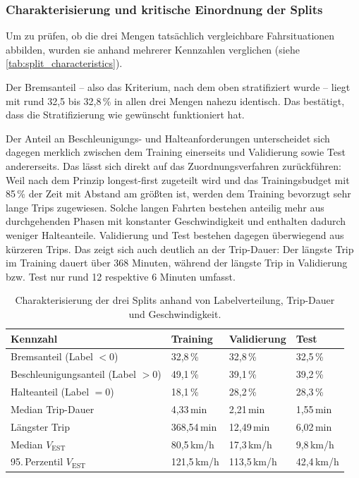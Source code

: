 \subsubsection{Charakterisierung und kritische Einordnung der Splits}

Um zu prüfen, ob die drei Mengen tatsächlich vergleichbare Fahrsituationen abbilden, wurden sie anhand mehrerer Kennzahlen verglichen (siehe \autoref{tab:split_characteristics}).

Der Bremsanteil -- also das Kriterium, nach dem oben stratifiziert wurde -- liegt mit rund 32,5 bis 32,8\,\% in allen drei Mengen nahezu identisch. Das bestätigt, dass die Stratifizierung wie gewünscht funktioniert hat.

Der Anteil an Beschleunigungs- und Halteanforderungen unterscheidet sich dagegen merklich zwischen dem Training einerseits und Validierung sowie Test andererseits. Das lässt sich direkt auf das Zuordnungsverfahren zurückführen: Weil nach dem Prinzip longest-first zugeteilt wird und das Trainingsbudget mit 85\,\% der Zeit mit Abstand am größten ist, werden dem Training bevorzugt sehr lange Trips zugewiesen. Solche langen Fahrten bestehen anteilig mehr aus durchgehenden Phasen mit konstanter Geschwindigkeit und enthalten dadurch weniger Halteanteile. Validierung und Test bestehen dagegen überwiegend aus kürzeren Trips. Das zeigt sich auch deutlich an der Trip-Dauer: Der längste Trip im Training dauert über 368 Minuten, während der längste Trip in Validierung bzw. Test nur rund 12 respektive 6 Minuten umfasst.

\begin{table}[h]
    \centering
    \small
    \caption[Charakterisierung der Datensplits]{Charakterisierung der drei Splits anhand von Labelverteilung, Trip-Dauer und Geschwindigkeit.}
    \label{tab:split_characteristics}
    \begin{tabularx}{\textwidth}{@{} l X X X @{}}
        \toprule
        \textbf{Kennzahl} & \textbf{Training} & \textbf{Validierung} & \textbf{Test} \\
        \midrule
        Bremsanteil (Label $<0$)        & 32,8\,\% & 32,8\,\% & 32,5\,\% \\
        Beschleunigungsanteil (Label $>0$) & 49,1\,\% & 39,1\,\% & 39,2\,\% \\
        Halteanteil (Label $=0$)        & 18,1\,\% & 28,2\,\% & 28,3\,\% \\
        \addlinespace
        Median Trip-Dauer               & 4,33\,min & 2,21\,min & 1,55\,min \\
        Längster Trip                   & 368,54\,min & 12,49\,min & 6,02\,min \\
        \addlinespace
        Median $V_{\text{EST}}$         & 80,5\,km/h & 17,3\,km/h & 9,8\,km/h \\
        95.\,Perzentil $V_{\text{EST}}$ & 121,5\,km/h & 113,5\,km/h & 42,4\,km/h \\
        \bottomrule
    \end{tabularx}
\end{table}

